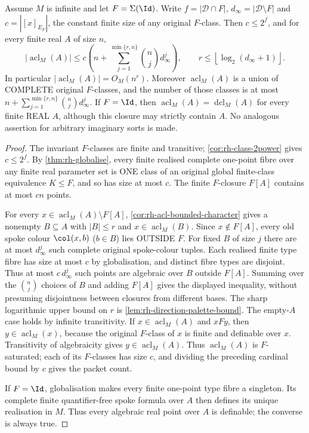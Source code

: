 \begin{corollary}
\label{cor:rh-acl-polynomial-growth}
Assume $M$ is infinite and let $F=\Sigma(\Id)$.
Write $f=|\mathcal D\cap F|$,
$d_\infty=|\mathcal D\setminus F|$ and
$c=|[x]_{E_F}|$, the constant finite size of any
original $F$-class.  Then $c\le 2^f$, and for
every finite real $A$ of size $n$,
\[
 |\operatorname{acl}_M(A)|
 \le c\left(n+
      \sum_{j=1}^{\min\{r,n\}}
           \binom{n}{j}d_\infty^j\right),
 \qquad
 r\le\left\lfloor\log_2(d_\infty+1)\right\rfloor.
\]
In particular $|\operatorname{acl}_M(A)|=O_M(n^r)$.
Moreover $\operatorname{acl}_M(A)$ is a union of COMPLETE
original $F$-classes, and the number of those classes is at most
$n+\sum_{j=1}^{\min\{r,n\}}\binom{n}{j}d_\infty^j$.
If $F=\Id$, then
$\operatorname{acl}_M(A)=\operatorname{dcl}_M(A)$
for every finite REAL $A$, although this closure may
strictly contain $A$.
No analogous assertion for arbitrary imaginary sorts is made.
\end{corollary}
\begin{proof}
The invariant $F$-classes are finite and transitive;
\cref{cor:rh-class-2power} gives $c\le 2^f$.
By \cref{thm:rh-globalise}, every finite realised
complete one-point fibre over any finite real parameter
set is ONE class of an original global finite-class
equivalence $K\le F$, and so has size at most $c$.
The finite $F$-closure $F[A]$ contains at most $cn$ points.

For every $x\in\operatorname{acl}_M(A)\setminus F[A]$,
\cref{cor:rh-acl-bounded-character} gives a nonempty
$B\subseteq A$ with $|B|\le r$ and
$x\in\operatorname{acl}_M(B)$.
Since $x\notin F[A]$, every old spoke colour
$\col(x,b)$ ($b\in B$) lies OUTSIDE $F$.
For fixed $B$ of size $j$ there are at most
$d_\infty^j$ such complete original spoke-colour
tuples.  Each realised finite type fibre has
size at most $c$ by globalisation, and distinct
fibre types are disjoint.  Thus at most
$c\,d_\infty^j$ such points are algebraic over
$B$ outside $F[A]$.  Summing over the
$\binom nj$ choices of $B$ and adding $F[A]$
gives the displayed inequality, without presuming
disjointness between closures from different bases.
The sharp logarithmic upper bound on $r$ is
\cref{lem:rh-direction-palette-bound}.
The empty-$A$ case holds by infinite transitivity.
If $x\in\operatorname{acl}_M(A)$ and $xFy$, then
$y\in\operatorname{acl}_M(x)$, because the original $F$-class
of $x$ is finite and definable over $x$.
Transitivity of algebraicity gives
$y\in\operatorname{acl}_M(A)$.
Thus $\operatorname{acl}_M(A)$ is $F$-saturated;
each of its $F$-classes has size $c$, and dividing
the preceding cardinal bound by $c$ gives the packet count.

If $F=\Id$, globalisation makes every finite
one-point type fibre a singleton.  Its complete
finite quantifier-free spoke formula over $A$
then defines its unique realisation in $M$.
Thus every algebraic real point over $A$ is
definable; the converse is always true.
\end{proof}

